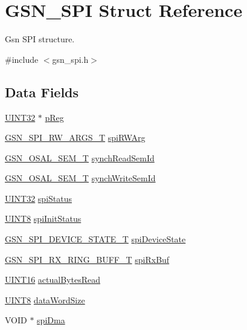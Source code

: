 \hypertarget{a00230}{
\section{GSN\_\-SPI Struct Reference}
\label{a00230}
}


Gsn SPI structure.  




{\ttfamily \#include $<$gsn\_\-spi.h$>$}

\subsection*{Data Fields}
\begin{DoxyCompactItemize}
\item 
\hyperlink{a00660_gae1e6edbbc26d6fbc71a90190d0266018}{UINT32} $\ast$ \hyperlink{a00230_a8843236297383a79c5da2bbddfcee223}{pReg}
\item 
\hyperlink{a00239}{GSN\_\-SPI\_\-RW\_\-ARGS\_\-T} \hyperlink{a00230_acb4512599754c80bddd73e9a02574f9e}{spiRWArg}
\item 
\hyperlink{a00628_gab4b3554407ce22b940e2fcd3faf5fd47}{GSN\_\-OSAL\_\-SEM\_\-T} \hyperlink{a00230_a0ae46c6bc8db30c9e5f95b0db8291410}{synchReadSemId}
\item 
\hyperlink{a00628_gab4b3554407ce22b940e2fcd3faf5fd47}{GSN\_\-OSAL\_\-SEM\_\-T} \hyperlink{a00230_ae01fab2e8492394ab72da071913c49fd}{synchWriteSemId}
\item 
\hyperlink{a00660_gae1e6edbbc26d6fbc71a90190d0266018}{UINT32} \hyperlink{a00230_a8d5ce5c67020a6ef8da05f58f4593c0e}{spiStatus}
\item 
\hyperlink{a00660_gab27e9918b538ce9d8ca692479b375b6a}{UINT8} \hyperlink{a00230_a37e30f5b408d31bdf077d448268cee43}{spiInitStatus}
\item 
\hyperlink{a00587_a6a9138b2111d919287d97122c32fbc02}{GSN\_\-SPI\_\-DEVICE\_\-STATE\_\-T} \hyperlink{a00230_a4c476950e1b6c17d70082d31569f567b}{spiDeviceState}
\item 
\hyperlink{a00240}{GSN\_\-SPI\_\-RX\_\-RING\_\-BUFF\_\-T} \hyperlink{a00230_a07362b10241aa321cb021f90e60ba4c8}{spiRxBuf}
\item 
\hyperlink{a00660_ga09f1a1fb2293e33483cc8d44aefb1eb1}{UINT16} \hyperlink{a00230_aa458a81c4cc5863c64abf7dac4d6a497}{actualBytesRead}
\item 
\hyperlink{a00660_gab27e9918b538ce9d8ca692479b375b6a}{UINT8} \hyperlink{a00230_ad3c2f2d6e4146b01aa1dd5ba2745ce46}{dataWordSize}
\item 
VOID $\ast$ \hyperlink{a00230_ab08af989c36bfccd7ef415ab4723fec7}{spiDma}

\end{DoxyCompactItemize}
